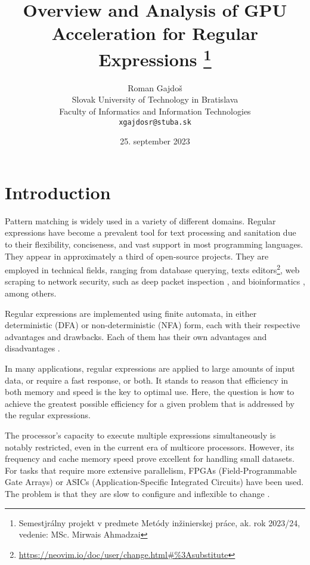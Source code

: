 \documentclass[10pt,onecolumn,twoside,english,a4paper]{article}
\title{Overview and Analysis of GPU Acceleration for Regular Expressions
\thanks{Semestjrálny projekt v predmete Metódy inžinierskej práce, ak. rok 2023/24, vedenie: MSc. Mirwais Ahmadzai}} %
\author{Roman Gajdoš\\[2pt]
	{\small Slovak University of Technology in Bratislava}\\
	{\small Faculty of Informatics and Information Technologies}\\
	{\small \texttt{xgajdosr@stuba.sk}}
	}
\date{\small 25. september 2023} %
\begin{document}
\maketitle

\begin{abstract}
  \blindtext[2]

\end{abstract}

\section{Introduction} \label{Introduction}
Pattern matching is widely used in a variety of different domains. Regular expressions have become a prevalent tool for text processing and sanitation due to their flexibility, conciseness, and vast support in most programming languages\cite{Chapman:Usage}. They appear in approximately a third of open-source projects\cite{Davis:Re-use}. They are employed in technical fields, ranging from database querying\cite{István:databases-regex}, texts editors\footnote{\url{https://neovim.io/doc/user/change.html\#\%3Asubstitute}}, web scraping \cite{Gunawan2019/03} to network security, such as deep packet inspection \cite{becchi2008workload}, and bioinformatics \cite{huang2008gpu}, among others.

Regular expressions are implemented using finite automata, in either deterministic (DFA) or non-deterministic (NFA) form, each with their respective advantages and drawbacks. Each of them has their own advantages and disadvantages \cite{Becchi:regex_large_dataset,Nourian:DemystifyingFSA,Zu:GPU-NFA}.

In many applications, regular expressions are applied to large amounts of input data, or require a fast response, or both. It stands to reason that efficiency in both memory and speed is the key to optimal use\cite{Xia:FSA-scaling}.
Here, the question is how to achieve the greatest possible efficiency for a given problem that is addressed by the regular expressions.

The processor's capacity to execute multiple expressions simultaneously is notably restricted, even in the current era of multicore processors\cite{Lee:myths}. However, its frequency and cache memory speed prove excellent for handling small datasets. For tasks that require more extensive parallelism, FPGAs (Field-Programmable Gate Arrays) or ASICs (Application-Specific Integrated Circuits) have been used. The problem is that they are slow to configure\cite{XU:regex_alg_slow} and inflexible to change \cite{fuchs2019accelerator,Liu:Asynchronous}.
\end{document}
